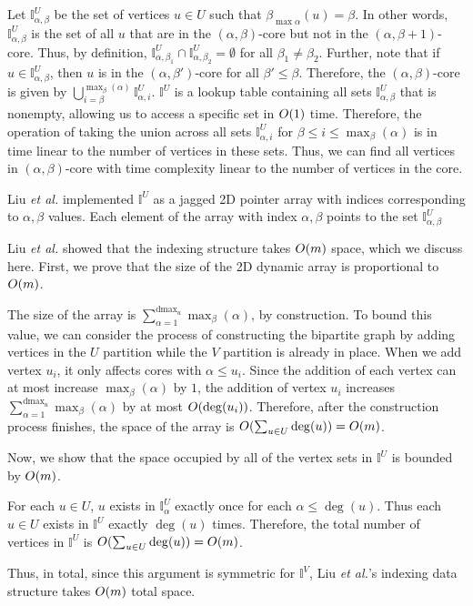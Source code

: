 Let $\mathbb{I}^U_{\alpha,\beta}$ be the set of vertices $u\in U$ such that $\beta_{\max \alpha}(u) = \beta$. In other words, $\mathbb{I}^U_{\alpha,\beta}$ is the set of all $u$ that are in the $(\alpha, \beta)$-core but not in the $(\alpha, \beta+1)$-core. Thus, by definition, $\mathbb{I}^U_{\alpha,\beta_1} \cap \mathbb{I}^U_{\alpha,\beta_2} = \emptyset$ for all $\beta_1 \neq \beta_2$. Further, note that if $u\in \mathbb{I}^U_{\alpha,\beta}$, then $u$ is in the $(\alpha, \beta')$-core for all $\beta' \le \beta$. Therefore, the $(\alpha, \beta)$-core is given by $ \bigcup_{i = \beta}^{\max_\beta(\alpha)} \mathbb{I}^U_{\alpha,i}$. $\mathbb{I}^U$ is a lookup table containing all sets $\mathbb{I}^U_{\alpha,\beta}$ that is nonempty, allowing us to access a specific set in $O(1)$ time. Therefore, the operation of taking the union across all sets $\mathbb{I}^U_{\alpha,i}$ for $\beta \le i\le \max_\beta(\alpha)$ is in time linear to the number of vertices in these sets. Thus, we can find all vertices in $(\alpha,\beta)$-core with time complexity linear to the number of vertices in the core. 

Liu \textit{et al.} implemented $\mathbb{I}^U$ as a jagged 2D pointer array with indices corresponding to $\alpha,\beta$ values. Each element of the array with index $\alpha,\beta$ points to the set $\mathbb{I}^U_{\alpha,\beta}$

Liu \textit{et al.} showed that the indexing structure takes $O(m)$ space, which we discuss here.
First, we prove that the size of the 2D dynamic array is proportional to $O(m)$. 

The size of the array is $\sum_{\alpha=1}^{\text{dmax}_u} \max_\beta(\alpha)$, by construction. To bound this value, we can consider the process of constructing the bipartite graph by adding vertices in the $U$ partition while the $V$ partition is already in place. When we add vertex $u_i$, it only affects cores with $\alpha\le u_i$. Since the addition of each vertex can at most increase $\max_\beta(\alpha)$ by $1$, the addition of vertex $u_i$ increases $\sum_{\alpha=1}^{\text{dmax}_u} \max_\beta(\alpha)$ by at most $O(\deg(u_i))$. Therefore, after the construction process finishes, the space of the array is $O(\sum_{u\in U} \deg(u)) = O(m)$.

Now, we show that the space occupied by all of the vertex sets in $\mathbb{I}^U$ is bounded by $O(m)$.

For each $u\in U$, $u$ exists in $\mathbb{I}^U_{\alpha}$ exactly once for each $\alpha \le \deg(u)$. Thus each $u\in U$ exists in $\mathbb{I}^U$ exactly $\deg(u)$ times. Therefore, the total number of vertices in $\mathbb{I}^U$ is $O(\sum_{u\in U} \deg(u)) = O(m)$. 

Thus, in total, since this argument is symmetric for $\mathbb{I}^V$, Liu \textit{et al.}'s indexing data structure takes $O(m)$ total space.

